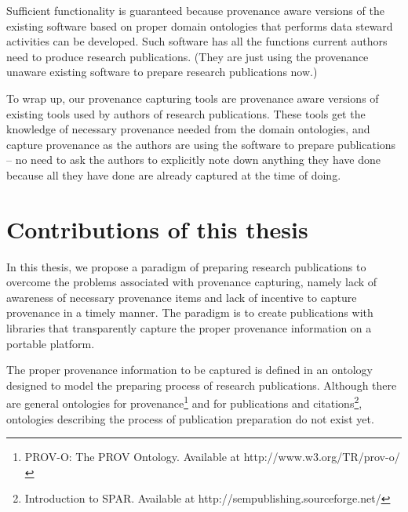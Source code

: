 Sufficient functionality is guaranteed because provenance aware versions of the existing software based on proper domain ontologies that performs data steward activities can be developed. Such software has all the functions current authors need to produce research publications. (They are just using the provenance unaware existing software to prepare research publications now.) 

To wrap up, our provenance capturing tools are provenance aware versions of existing tools used by authors of research publications. These tools get the knowledge of necessary provenance needed from the domain ontologies, and capture provenance as the authors are using the software to prepare publications -- no need to ask the authors to explicitly note down anything they have done because all they have done are already captured at the time of doing.

\section{Contributions of this thesis}
In this thesis, we propose a paradigm of preparing research publications to overcome the problems associated with provenance capturing, namely lack of awareness of necessary provenance items and lack of incentive to capture provenance in a timely manner. The paradigm is to create publications with libraries that transparently capture the proper provenance information on a portable platform.

The proper provenance information to be captured is defined in an ontology designed to model the preparing process of research publications. Although there are general ontologies for provenance\footnote{PROV-O: The PROV Ontology. Available at http://www.w3.org/TR/prov-o/} and for publications and citations\footnote{Introduction to SPAR. Available at http://sempublishing.sourceforge.net/}, ontologies describing the process of publication preparation do not exist yet.

